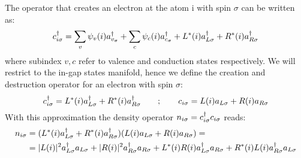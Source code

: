 The operator that creates an electron at the atom i with spin $\sigma$ can be written as:
\begin{equation}
  c^{\dagger}_{i\sigma} = \sum_v\psi_v(i)a^{\dagger}_{v_\sigma}+
                      \sum_c\psi_c(i)a^{\dagger}_{c_\sigma}+
                      L^*(i)a^{\dagger}_{L\sigma} + R^*(i)a^{\dagger}_{R\sigma}
\label{creation}
\end{equation}
where subindex $v,c$ refer to valence and conduction states respectively. We will restrict to the in-gap states manifold, hence we define the creation and destruction operator for an electron with spin $\sigma$:
\begin{equation}
  c^{\dagger}_{i\sigma} = L^*(i)a^{\dagger}_{L\sigma} + R^*(i)a^{\dagger}_{R\sigma}
  \quad\quad;\quad\quad
  c_{i\sigma} = L(i)a_{L\sigma} + R(i)a_{R\sigma}
\end{equation}
With this approximation the density operator $n_{i\sigma} = c^{\dagger}_{i\sigma}c_{i\sigma}$  reads:
\begin{equation}
  \begin{split}
  n_{i\sigma} &= (L^*(i)a^{\dagger}_{L\sigma} + R^*(i)a^{\dagger}_{R\sigma})
                 (L(i)a_{L\sigma} + R(i)a_{R\sigma}) =\\
              &= |L(i)|^2 a^{\dagger}_{L\sigma}a_{L\sigma}+
                 |R(i)|^2 a^{\dagger}_{R\sigma}a_{R\sigma}+
                 L^*(i)R(i)a^{\dagger}_{L\sigma}a_{R\sigma}+
                 R^*(i)L(i)a^{\dagger}_{R\sigma}a_{L\sigma}
  \end{split}
\end{equation}

